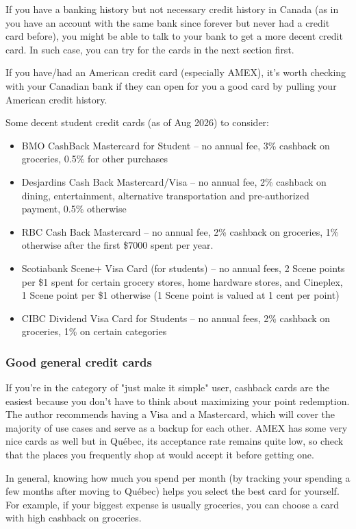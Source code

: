 If you have a banking history but not necessary credit history in Canada (as in you have an account with the same bank since forever but never had a credit card before), you might be able to talk to your bank to get a more decent credit card. In such case, you can try for the cards in the next section first.

If you have/had an American credit card (especially AMEX), it's worth checking with your Canadian bank if they can open for you a good card by pulling your American credit history. 

Some decent student credit cards (as of Aug 2026) to consider:
\begin{itemize}
    \item BMO CashBack Mastercard for Student -- no annual fee, 3\% cashback on groceries, 0.5\% for other purchases
    \item Desjardins Cash Back Mastercard/Visa -- no annual fee, 2\% cashback on dining, entertainment, alternative transportation and pre-authorized payment, 0.5\% otherwise
    \item RBC Cash Back Mastercard -- no annual fee, 2\% cashback on groceries, 1\% otherwise after the first \$7000 spent per year.
    \item Scotiabank Scene+ Visa Card (for students) -- no annual fees, 2 Scene points per \$1 spent for certain grocery stores, home hardware stores, and Cineplex, 1 Scene point per \$1 otherwise (1 Scene point is valued at 1 cent per point)
    \item CIBC Dividend Visa Card for Students -- no annual fees, 2\% cashback on groceries, 1\% on certain categories
\end{itemize}

\subsubsection{Good general credit cards}

If you're in the category of "just make it simple" user, cashback cards are the easiest because you don't have to think about maximizing your point redemption. The author recommends having a Visa and a Mastercard, which will cover the majority of use cases and serve as a backup for each other. AMEX has some very nice cards as well but in Québec, its acceptance rate remains quite low, so check that the places you frequently shop at would accept it before getting one.

In general, knowing how much you spend per month (by tracking your spending a few months after moving to Québec) helps you select the best card for yourself. For example, if your biggest expense is usually groceries, you can choose a card with high cashback on groceries. 

